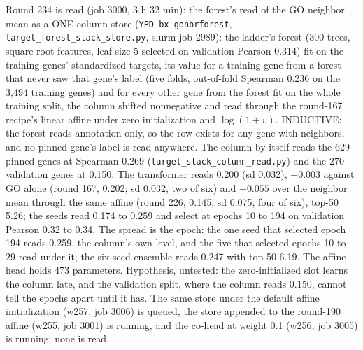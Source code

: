Round 234 is read (job 3000, 3 h 32 min): the forest's read of the GO neighbor mean as
a ONE-column store (\texttt{YPD\_bx\_gonbrforest}, \texttt{target\_forest\_stack\_store.py},
slurm job 2989): the ladder's forest (300 trees, square-root features, leaf size 5
selected on validation Pearson 0.314) fit on the training genes' standardized targets,
its value for a training gene from a forest that never saw that gene's label (five
folds, out-of-fold Spearman 0.236 on the 3,494 training genes) and for every other gene
from the forest fit on the whole training split, the column shifted nonnegative and
read through the round-167 recipe's linear affine under zero initialization and
$\log(1 + v)$. INDUCTIVE: the forest reads annotation only, so the row exists for any
gene with neighbors, and no pinned gene's label is read anywhere. The column by itself
reads the 629 pinned genes at Spearman 0.269 (\texttt{target\_stack\_column\_read.py})
and the 270 validation genes at 0.150. The transformer reads 0.200 (sd 0.032),
$-0.003$ against GO alone (round 167, 0.202; sd 0.032, two of six) and $+0.055$ over
the neighbor mean through the same affine (round 226, 0.145; sd 0.075, four of six),
top-50 5.26; the seeds read 0.174 to 0.259 and select at epochs 10 to 194 on validation
Pearson 0.32 to 0.34. The spread is the epoch: the one seed that selected epoch 194
reads 0.259, the column's own level, and the five that selected epochs 10 to 29 read
under it; the six-seed ensemble reads 0.247 with top-50 6.19. The affine head holds 473
parameters. Hypothesis, untested: the zero-initialized slot learns the column late,
and the validation split, where the column reads 0.150, cannot tell the epochs apart
until it has. The same store under the default affine initialization (w257, job 3006)
is queued, the store appended to the round-190 affine (w255, job 3001) is running, and
the co-head at weight 0.1 (w256, job 3005) is running; none is read.


